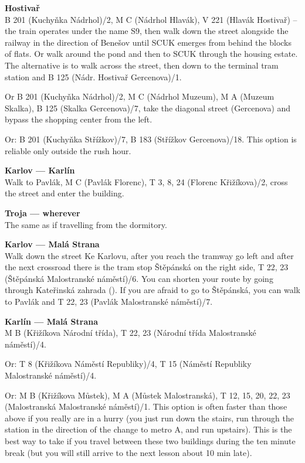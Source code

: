 \textbf{Hostivař}\\
B 201 (Kuchyňka \ra Nádrhol)/2, M C (Nádrhol \ra Hlavák), V 221 (Hlavák \ra
Hostivař) -- the train operates under the name S9, then walk down the street
alongside the railway in the direction of Benešov until SCUK emerges from behind
the blocks of flats. Or walk around the pond and then to SCUK through the
housing estate.
The alternative is to walk across the street, then down to the terminal tram
station and B
125 (Nádr. Hostivař \ra Gercenova)/1.

Or B 201 (Kuchyňka \ra Nádrhol)/2, M C (Nádrhol \ra Muzeum), M A (Muzeum \ra
Skalka), B 125 (Skalka \ra Gercenova)/7, take the diagonal street (Gercenova)
and bypass the shopping center from the left.

Or: B 201 (Kuchyňka \ra Střížkov)/7, B 183 (Střížkov \ra Gercenova)/18. This
option is reliable only outside the rush hour.

\textbf{Karlov --- Karlín}\\
Walk to Pavlák, M C (Pavlák \ra Florenc), T 3, 8, 24 (Florenc \ra Křižíkova)/2,
cross the street and enter the building.

\textbf{Troja --- wherever}\\
The same as if travelling from the dormitory.

\textbf{Karlov --- Malá Strana}\\
Walk down the street Ke Karlovu, after you reach the tramway go left and after
the next crossroad there is the tram stop Štěpánská on the right side, T 22, 23
(Štěpánská \ra
Malostranské náměstí)/6. You can shorten your route by going through Kateřinská
zahrada ().
If you are afraid to go to Štěpánská, you can walk to Pavlák and T 22, 23
(Pavlák \ra
Malostranské náměstí)/7.

\textbf{Karlín --- Malá Strana}\\
M B (Křižíkova \ra Národní třída), T 22, 23 (Národní třída \ra Malostranské
náměstí)/4.

Or: T 8 (Křižíkova \ra Náměstí Republiky)/4, T 15 (Náměstí Republiky \ra
Malostranské náměstí)/4.

Or: M B (Křižíkova \ra Můstek), M A (Můstek \ra Malostranská), T 12, 15, 20,
22, 23 (Malostranská \ra Malostranské náměstí)/1. This option is often faster
than those above if you really are in a hurry (you just run down the stairs, run
through the station in the direction of the change to metro A, and run
upstairs).
This is the best way to take if you travel between these two buildings during
the ten minute break (but you will still arrive to the next lesson about 10 min
late).